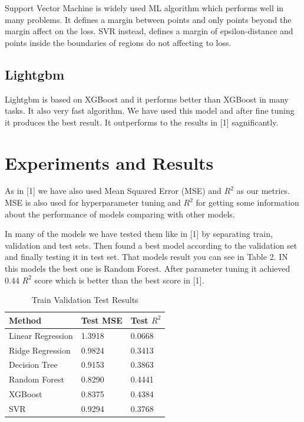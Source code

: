 \documentclass{article}
\begin{document}
Support Vector Machine is widely used ML algorithm which performs well in many problems. It defines a margin between points and only points beyond the margin affect on the loss. SVR instead, defines a margin of epsilon-distance and points inside the boundaries of regions do not affecting to loss. 

\subsection{Lightgbm}

Lightgbm is based on XGBoost and it performs better than XGBoost in many tasks. It also very fast algorithm. We have used this model and after fine tuning it produces the best result. It outperforms to the results in [1] sagnificantly. 

\section{Experiments and Results}

As in [1] we have also used Mean Squared Error (MSE) and $R^2$ as our metrics. MSE is also used for hyperparameter tuning and $R^2$ for getting some information about the performance of models comparing with other models. 

In many of the models we have tested them like in [1] by separating train, validation and test sets. Then found a best model according to the validation set and finally testing it in test set. That models result you can see in Table 2. IN this models the best one is Random Forest. After parameter tuning it achieved 0.44 $R^2$ score which is better than the best score in [1]. 

\begin{table}
  \caption{Train Validation Test Results}
  \label{tvt_results-table}
  \centering
  \begin{tabular}{lll}
    \toprule
    Method & Test MSE &  Test $R^2$  \\
    \midrule
    Linear Regression & 1.3918  & 0.0668   \\
    Ridge Regression & 0.9824  & 0.3413   \\
    Decision Tree & 0.9153  & 0.3863   \\
    Random Forest & 0.8290  & 0.4441   \\
    XGBoost & 0.8375 & 0.4384 \\
    SVR & 0.9294 & 0.3768 \\
        \bottomrule
  \end{tabular}
\end{table}
\end{document}
